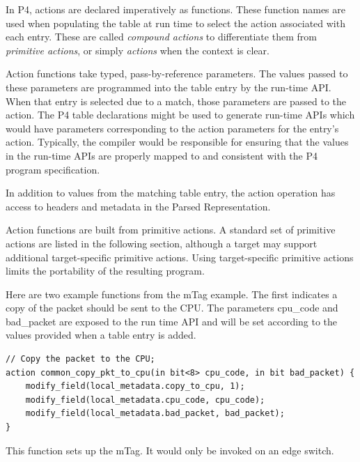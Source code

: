 \documentclass[12pt]{article}
\begin{document}

In P4, actions are declared imperatively as functions. These function
names are used when populating the table at run time to select the
action associated with each entry. These are called \textit{compound
actions} to differentiate them from \textit{primitive actions}, or
simply \textit{actions} when the context is clear.

Action functions take typed, pass-by-reference parameters. The values 
passed to these parameters are programmed into the table entry by the run-time
API. When that entry is selected due to a match, those parameters are
passed to the action. The P4 table declarations might be used to
generate run-time APIs which would have parameters corresponding to
the action parameters for the entry's action. Typically, the compiler
would be responsible for ensuring that the values in the run-time APIs
are properly mapped to and consistent with the P4 program
specification.

In addition to values from the matching table entry, the action operation 
has access to headers and metadata in the Parsed Representation.

Action functions are built from primitive actions. A standard set of
primitive actions are listed in the following section, although a
target may support additional target-specific primitive actions. Using
target-specific primitive actions limits the portability of the resulting
program.

Here are two example functions from the mTag example.  The first indicates 
a copy of the packet should be sent to the CPU.  The parameters cpu_code 
and bad_packet are exposed to the run time API and will be set according 
to the values provided when a table entry is added.

\begin{lstlisting}[style=P4style]
// Copy the packet to the CPU;
action common_copy_pkt_to_cpu(in bit<8> cpu_code, in bit bad_packet) {
    modify_field(local_metadata.copy_to_cpu, 1);
    modify_field(local_metadata.cpu_code, cpu_code);
    modify_field(local_metadata.bad_packet, bad_packet);
}
\end{lstlisting}

This function sets up the mTag. It would only be invoked on an edge switch.
\end{document}
